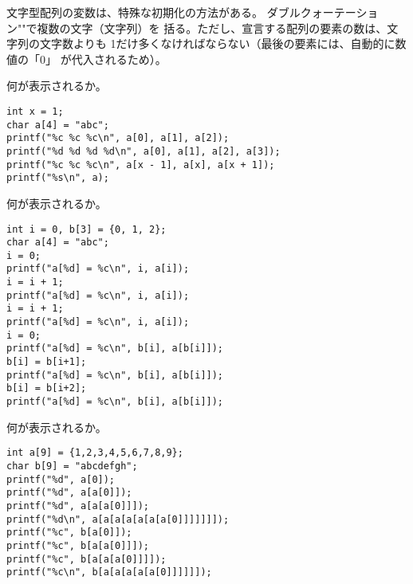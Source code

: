 \documentclass[12pt,a4j]{jarticle}
\newcounter{toi}
\def\toi{%
\bigskip\bigskip\noindent
\addtocounter{toi}{1}
\shadowbox{\bfseries\large 問\thetoi}
\nopagebreak[4]\bigskip\nopagebreak[4]
}
\begin{document}
\toi

文字型配列の変数は、特殊な初期化の方法がある。
ダブルクォーテーション{\ttfamily ""}で複数の文字（文字列）を
括る。ただし、宣言する配列の要素の数は、文字列の文字数よりも
1だけ多くなければならない（最後の要素には、自動的に数値の「0」
が代入されるため）。



何が表示されるか。
\begin{verbatim}
int x = 1;
char a[4] = "abc";
printf("%c %c %c\n", a[0], a[1], a[2]);
printf("%d %d %d %d\n", a[0], a[1], a[2], a[3]);
printf("%c %c %c\n", a[x - 1], a[x], a[x + 1]);
printf("%s\n", a);
\end{verbatim}






\toi


何が表示されるか。
\begin{verbatim}
int i = 0, b[3] = {0, 1, 2};
char a[4] = "abc";
i = 0;
printf("a[%d] = %c\n", i, a[i]);
i = i + 1;
printf("a[%d] = %c\n", i, a[i]);
i = i + 1;
printf("a[%d] = %c\n", i, a[i]);
i = 0;
printf("a[%d] = %c\n", b[i], a[b[i]]);
b[i] = b[i+1];
printf("a[%d] = %c\n", b[i], a[b[i]]);
b[i] = b[i+2];
printf("a[%d] = %c\n", b[i], a[b[i]]);
\end{verbatim}






\toi


何が表示されるか。
\begin{verbatim}
int a[9] = {1,2,3,4,5,6,7,8,9};
char b[9] = "abcdefgh";
printf("%d", a[0]);
printf("%d", a[a[0]]);
printf("%d", a[a[a[0]]]);
printf("%d\n", a[a[a[a[a[a[a[0]]]]]]]);
printf("%c", b[a[0]]);
printf("%c", b[a[a[0]]]);
printf("%c", b[a[a[a[0]]]]);
printf("%c\n", b[a[a[a[a[a[0]]]]]]);
\end{verbatim}
\end{document}
